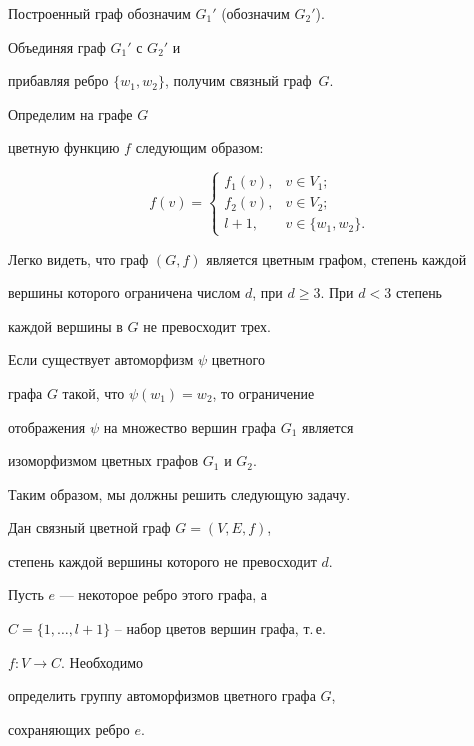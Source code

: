 Построенный граф обозначим $G_1'$ (обозначим $G_2'$).


Объединяя граф $G_1'$ с $G_2'$ и


прибавляя ребро $\{w_1, w_2\}$, получим связный граф~$G$.


Определим на графе $G$


цветную функцию $f$ следующим образом:


$$


f(v)=\begin{cases}


f_1(v), & v\in V_1;\\


f_2(v), & v\in V_2;\\


l+1, &v\in\{w_1, w_2\}.


\end{cases}


$$





Легко видеть, что граф $(G, f)$ является цветным графом, степень каждой


вершины которого ограничена числом $d$, при $d\ge 3$. При $d<3$ степень


каждой вершины в $G$ не превосходит трех.





Если существует автоморфизм  $\psi$ цветного


графа $G$ такой, что $\psi(w_1)=w_2$, то ограничение


отображения $\psi$ на множество вершин графа $G_1$ является


изоморфизмом цветных графов $G_1$ и $G_2$.





Таким образом, мы должны решить следующую задачу.





\begin{probs}


Дан связный цветной граф $G=(V, E, f)$,


степень каждой вершины которого не превосходит $d$.


Пусть $e$ --- некоторое ребро этого графа, а


$C=\{1, \dotsc, l+1\}$ -- набор цветов вершин графа, т.\,е.


$f:V\to C$. Необходимо


определить группу автоморфизмов цветного графа $G$,


сохраняющих ребро $e$.


\label{color_aut2}


\end{probs}





